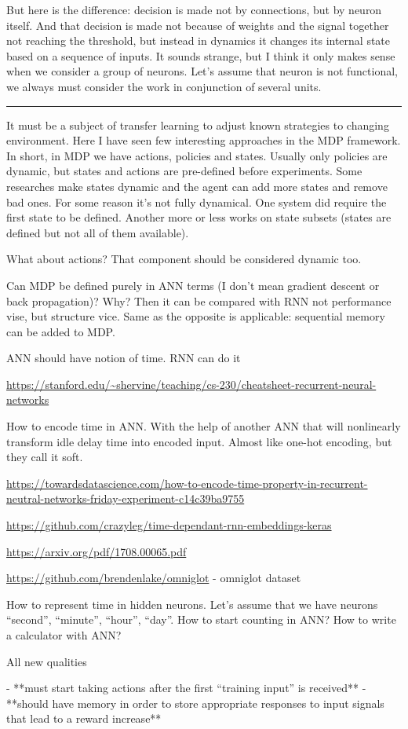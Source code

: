 \documentclass[draft]{article}
\begin{document}
But here is the difference: decision is made not by connections, but by neuron itself. And that decision is made not because of weights and the signal together not reaching the threshold, but instead in dynamics it changes its internal state based on a sequence of inputs. It sounds strange, but I think it only makes sense when we consider a group of neurons. Let’s assume that neuron is not functional, we always must consider the work in conjunction of several units. 

\medskip\hrule\medskip

It must be a subject of transfer learning to adjust known strategies to changing environment. Here I have seen few interesting approaches in the MDP framework. In short, in MDP we have actions, policies and states. Usually only policies are dynamic, but states and actions are pre-defined before experiments. Some researches make states dynamic and the agent can add more states and remove bad ones. For some reason it’s not fully dynamical. One system did require the first state to be defined. Another more or less works on state subsets (states are defined but not all of them available).


What about actions? That component should be considered dynamic too.

Can MDP be defined purely in ANN terms (I don’t mean gradient descent or back propagation)? Why? Then it can be compared with RNN not performance vise, but structure vice. Same as the opposite is applicable: sequential memory can be added to MDP.


ANN should have notion of time. RNN can do it

\url{https://stanford.edu/~shervine/teaching/cs-230/cheatsheet-recurrent-neural-networks}

How to encode time in ANN. With the help of another ANN that will nonlinearly transform idle delay time into encoded input. Almost like one-hot encoding, but they call it soft.

\url{https://towardsdatascience.com/how-to-encode-time-property-in-recurrent-neutral-networks-friday-experiment-c14c39ba9755}

\url{https://github.com/crazyleg/time-dependant-rnn-embeddings-keras}

\url{https://arxiv.org/pdf/1708.00065.pdf}

\url{https://github.com/brendenlake/omniglot} - omniglot dataset

How to represent time in hidden neurons. Let’s assume that we have neurons “second”, “minute”, “hour”, “day”. How to start counting in ANN? How to write a calculator with ANN?

All new qualities

- **must start taking actions after the first “training input” is received**
- **should have memory in order to store appropriate responses to input signals that lead to a reward increase**




\end{document}
